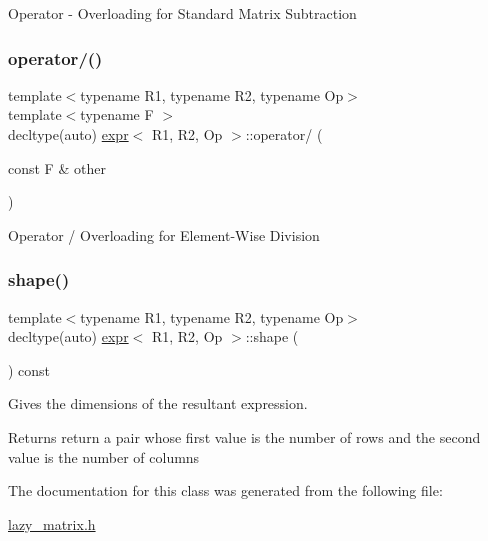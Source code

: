 Operator -\/ Overloading for Standard Matrix Subtraction \mbox{\label{classexpr_abf2a263cd1346fe818d886cdc94ae4d0}} 
\subsubsection{\texorpdfstring{operator/()}{operator/()}}
{\footnotesize\ttfamily template$<$typename R1, typename R2, typename Op$>$ \\
template$<$typename F $>$ \\
decltype(auto) \mbox{\hyperlink{classexpr}{expr}}$<$ R1, R2, Op $>$\+::operator/ (\begin{DoxyParamCaption}\item[{const F \&}]{other }\end{DoxyParamCaption})\hspace{0.3cm}{\ttfamily [inline]}}

Operator / Overloading for Element-\/\+Wise Division \mbox{\label{classexpr_aa61617d3e742a72e3ebbe3e289c32818}} 
\subsubsection{\texorpdfstring{shape()}{shape()}}
{\footnotesize\ttfamily template$<$typename R1, typename R2, typename Op$>$ \\
decltype(auto) \mbox{\hyperlink{classexpr}{expr}}$<$ R1, R2, Op $>$\+::shape (\begin{DoxyParamCaption}{ }\end{DoxyParamCaption}) const\hspace{0.3cm}{\ttfamily [inline]}}



Gives the dimensions of the resultant expression. 

\begin{DoxyReturn}{Returns}
return a pair whose first value is the number of rows and the second value is the number of columns 
\end{DoxyReturn}


The documentation for this class was generated from the following file\+:\begin{DoxyCompactItemize}
\item 
\mbox{\hyperlink{lazy__matrix_8h}{lazy\+\_\+matrix.\+h}}\end{DoxyCompactItemize}
